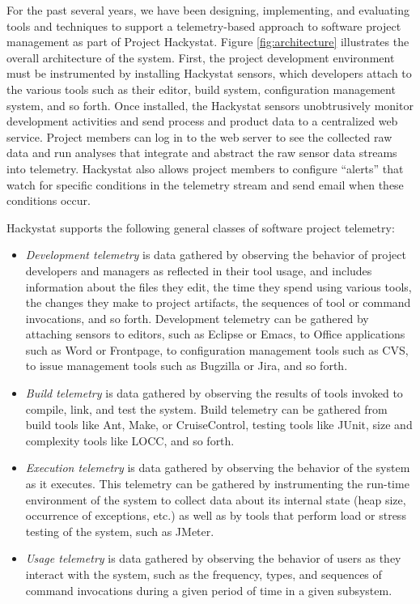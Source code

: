 \documentclass[11pt,twocolumn]{article}
\begin{document}

For the past several years, we have been designing, implementing, and
evaluating tools and techniques to support a telemetry-based approach to
software project management as part of Project Hackystat.  Figure
\ref{fig:architecture} illustrates the overall architecture of the
system. First, the project development environment must be instrumented by
installing Hackystat sensors, which developers attach to the various tools
such as their editor, build system, configuration management system, and so
forth. Once installed, the Hackystat sensors unobtrusively monitor
development activities and send process and product data to a centralized
web service.  Project members can log in to the web server to see the
collected raw data and run analyses that integrate and abstract the raw
sensor data streams into telemetry.  Hackystat also allows project members
to configure ``alerts'' that watch for specific conditions in the
telemetry stream and send email when these conditions occur.  

Hackystat supports the following general classes of software project telemetry:

\begin{itemize}

\item {\em Development telemetry} is data gathered by observing the
behavior of project developers and managers as reflected in their tool
usage, and includes information about the files they edit, the time they
spend using various tools, the changes they make to project artifacts, the
sequences of tool or command invocations, and so forth. Development
telemetry can be gathered by attaching sensors to editors, such as Eclipse
or Emacs, to Office applications such as Word or Frontpage, to
configuration management tools such as CVS, to issue management tools such
as Bugzilla or Jira, and so forth.

\item {\em Build telemetry} is data gathered by observing the results of
tools invoked to compile, link, and test the system. Build telemetry can be
gathered from build tools like Ant, Make, or CruiseControl, testing tools
like JUnit, size and complexity tools like LOCC, and so forth.

\item {\em Execution telemetry} is data gathered by observing the behavior of
the system as it executes. This telemetry can be gathered by instrumenting
the run-time environment of the system to collect data about its internal
state (heap size, occurrence of exceptions, etc.) as well as by tools that
perform load or stress testing of the system, such as JMeter.  

\item {\em Usage telemetry} is data gathered by observing the behavior of
users as they interact with the system, such as the frequency, types, and sequences
of command invocations during a given period of time in a given subsystem.

\end{itemize}
\end{document}
